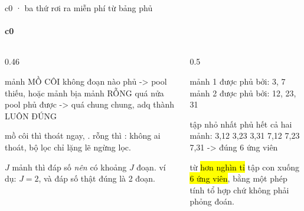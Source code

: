 \begin{frame}[fragile]{c0 · ba thứ rơi ra miễn phí từ bảng phủ}
  \framesubtitle{c0}

  \begin{columns}[t]
  \begin{column}{0.46\textwidth}
    \begin{keyb}[title={1 · cửa thoát, và sức khoẻ của mảnh}]
      \begin{dia}
mảnh MỒ CÔI  không đoạn nào phủ
             -> pool thiếu, hoặc mảnh bịa
mảnh RỖNG    quá nửa pool phủ được
             -> quá chung chung, adq
                thành LUÔN ĐÚNG
      \end{dia}
      \vspace{0.25em}
      mồ côi thì thoát ngay, . rỗng thì
      : không ai thoát, bộ lọc chỉ lặng lẽ ngừng lọc.
    \end{keyb}
    \begin{bx}[title={3 · đoán trước cỡ đáp số}]
      $J$ mảnh thì đáp số \emph{nên} có khoảng $J$ đoạn. ví dụ: $J = 2$, và đáp số
      thật đúng là 2 đoạn.
    \end{bx}
  \end{column}
  \begin{column}{0.5\textwidth}
    \begin{bx}[title={2 · danh sách ứng viên, giải chính xác}]
      \begin{dia}
mảnh 1 được phủ bởi:  {3, 7}
mảnh 2 được phủ bởi:  {12, 23, 31}

tập nhỏ nhất phủ hết cả hai mảnh:
  {3,12} {3,23} {3,31}
  {7,12} {7,23} {7,31}
                 -> đúng 6 ứng viên
      \end{dia}
      \vspace{0.25em}
      từ \hl{hơn nghìn tỉ} tập con xuống \hl{6 ứng viên}, bằng một phép tính tổ hợp
      chứ không phải phỏng đoán.
      \vspace{0.25em}

    \end{bx}
  \end{column}
  \end{columns}
\end{frame}

